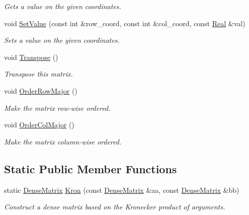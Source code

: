 \begin{DoxyCompactItemize}
\begin{DoxyCompactList}\small\item\em Gets a value on the given coordinates. \end{DoxyCompactList}\item 
void \hyperlink{classmtk_1_1DenseMatrix_ae0f873a6d3a734da467cafb817da64ae}{Set\-Value} (const int \&row\-\_\-coord, const int \&col\-\_\-coord, const \hyperlink{group__c01-roots_gac080bbbf5cbb5502c9f00405f894857d}{Real} \&val)
\begin{DoxyCompactList}\small\item\em Sets a value on the given coordinates. \end{DoxyCompactList}\item 
void \hyperlink{classmtk_1_1DenseMatrix_a71d9c07ca66e88d97d1fd5012f43138b}{Transpose} ()
\begin{DoxyCompactList}\small\item\em Transpose this matrix. \end{DoxyCompactList}\item 
void \hyperlink{classmtk_1_1DenseMatrix_ac2949efba3e8278335d45418c85433e4}{Order\-Row\-Major} ()
\begin{DoxyCompactList}\small\item\em Make the matrix row-\/wise ordered. \end{DoxyCompactList}\item 
void \hyperlink{classmtk_1_1DenseMatrix_a59b9bea24acf39dca64e8549b3527463}{Order\-Col\-Major} ()
\begin{DoxyCompactList}\small\item\em Make the matrix column-\/wise ordered. \end{DoxyCompactList}\end{DoxyCompactItemize}
\subsection*{Static Public Member Functions}
\begin{DoxyCompactItemize}
\item 
static \hyperlink{classmtk_1_1DenseMatrix}{Dense\-Matrix} \hyperlink{classmtk_1_1DenseMatrix_a01d3d8bd502870f93bf3a88a0cc5fb49}{Kron} (const \hyperlink{classmtk_1_1DenseMatrix}{Dense\-Matrix} \&aa, const \hyperlink{classmtk_1_1DenseMatrix}{Dense\-Matrix} \&bb)
\begin{DoxyCompactList}\small\item\em Construct a dense matrix based on the Kronecker product of arguments. \end{DoxyCompactList}\end{DoxyCompactItemize}
